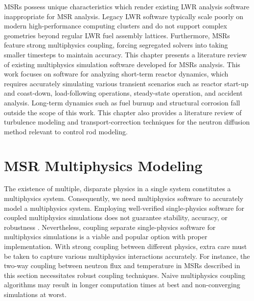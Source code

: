 \glspl{MSR} possess unique characteristics which render existing \gls{LWR}
analysis software inappropriate for \gls{MSR} analysis. Legacy \gls{LWR}
software typically scale poorly on modern high-performance computing
clusters and do not support complex geometries beyond regular \gls{LWR} fuel
assembly lattices. Furthermore, \glspl{MSR} feature strong multiphysics
coupling, forcing segregated solvers into taking smaller timesteps to
maintain accuracy. This chapter presents a literature
review of existing multiphysics simulation software developed for \glspl{MSR}
analysis. This work focuses on software for analyzing short-term reactor
dynamics, which requires accurately simulating various transient
scenarios such as reactor start-up and coast-down, load-following operations,
steady-state operation, and accident analysis. Long-term dynamics such as fuel
burnup and structural corrosion fall outside the scope of this work.
This chapter also provides a literature review of turbulence modeling and transport-correction
techniques for the neutron diffusion method relevant to control rod modeling.

\section{MSR Multiphysics Modeling} \label{sec:msr-multiphysics}

The existence of multiple, disparate physics in a single system constitutes a multiphysics system.
Consequently, we need multiphysics software to accurately model a multiphysics system. Employing
well-verified single-physics software for coupled multiphysics simulations does not guarantee
stability, accuracy, or robustness \cite{keyes_multiphysics_2013}. Nevertheless, coupling separate
single-physics software for multiphysics simulations is a viable and popular option with proper
implementation. With strong coupling between different physics, extra care must be
taken to capture various multiphysics interactions accurately. For instance, the two-way coupling
between neutron flux and temperature in \glspl{MSR} described in this section necessitates robust
coupling techniques. Naive multiphysics coupling algorithms may result in longer computation times
at best and non-converging simulations at worst.

